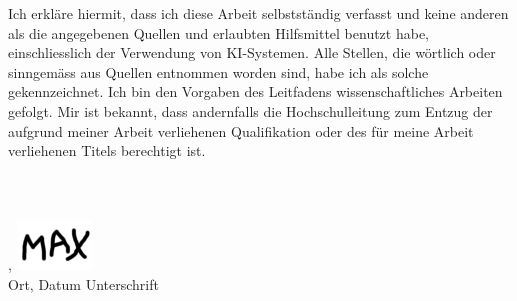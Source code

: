 \thispagestyle{empty}
\noindent
Ich erkläre hiermit, dass ich diese Arbeit selbstständig verfasst und keine anderen als die angegebenen Quellen und erlaubten Hilfsmittel benutzt habe, einschliesslich der Verwendung von KI-Systemen. Alle Stellen, die wörtlich oder sinngemäss aus Quellen entnommen worden sind, habe ich als solche gekennzeichnet. Ich bin den Vorgaben des Leitfadens wissenschaftliches Arbeiten gefolgt. Mir ist bekannt, dass andernfalls die Hochschulleitung zum Entzug der aufgrund meiner Arbeit verliehenen Qualifikation oder des für meine Arbeit verliehenen Titels berechtigt ist.\\
\\
\\
\\
\ort, \abgabedatum \hfill \includegraphics[width=2cm]{content/00_assets/unterschrift.png}\\
Ort, Datum \hfill Unterschrift \autorenschaft
